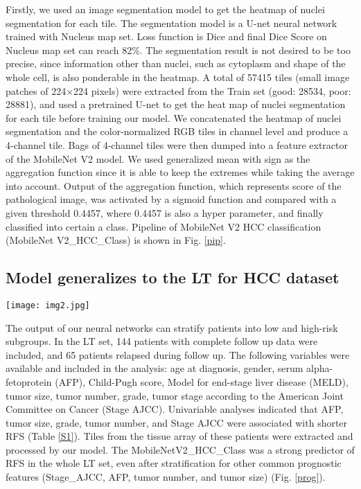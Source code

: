 \documentclass{article}
\begin{document}
Firstly, we used an image segmentation model to get the heatmap of nuclei segmentation for each tile. The segmentation model is a U-net neural network trained with Nucleus map set. Loss function is Dice and final Dice Score on Nucleus map set can reach 82\%. The segmentation result is not desired to be too precise, since information other than nuclei, such as cytoplasm and shape of the whole cell, is also ponderable in the heatmap. A total of 57415 tiles (small image patches of 224$\times $224 pixels) were extracted from the Train set (good: 28534, poor: 28881), and used a pretrained U-net to get the heat map of nuclei segmentation for each tile before training our model. We concatenated the heatmap of nuclei segmentation and the color-normalized RGB tiles in channel level and produce a 4-channel tile. Bags of 4-channel tiles were then dumped into a feature extractor of the MobileNet V2 model. We used generalized mean with sign as the aggregation function since it is able to keep the extremes while taking the average into account. Output of the aggregation function, which represents score of the pathological image, was activated by a sigmoid function and compared with a given threshold 0.4457, where 0.4457 is also a hyper parameter, and finally classified into certain a class. Pipeline of MobileNet V2 HCC classification (MobileNet V2\_HCC\_Class) is shown in Fig. \ref{pip}.



\subsection{Model generalizes to the LT for HCC dataset}

\begin{figure*}[!htp]
	\centerline{\texttt{[image: img2.jpg]}}
	\caption{Prognostic value of MobileNetV2\_HCC\_Class in the whole LT set and after stratification for common prognostic variables. The MobileNetV2\_HCC\_Class categorizes patients into low-risk and high-risk subgroups. The prognostic value of MobileNetV2\_HCC\_Class was conserved, even after stratification according to common clinical and pathological variables. AFP: alpha fetoprotein. Tumor\_No: tumor number. Diameter: total tumor diameter.}
	\label{prog}
\end{figure*}

The output of our neural networks can stratify patients into low and high-risk subgroups. In the LT set, 144 patients with complete follow up data were included, and 65 patients relapsed during follow up. The following variables were available and included in the analysis: age at diagnosis, gender, serum alpha-fetoprotein (AFP), Child-Pugh score, Model for end-stage liver disease (MELD), tumor size, tumor number, grade, tumor stage according to the American Joint Committee on Cancer (Stage AJCC). Univariable analyses indicated that AFP, tumor size, grade, tumor number, and Stage AJCC were associated with shorter RFS (Table \ref{S1}). Tiles from the tissue array of these patients were extracted and processed by our model. The MobileNetV2\_HCC\_Class was a strong predictor of RFS in the whole LT set, even after stratification for other common prognostic features (Stage\_AJCC, AFP, tumor number, and tumor size) (Fig. \ref{prog}).
\end{document}
